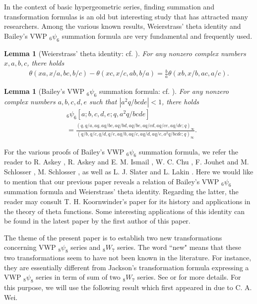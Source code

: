 \documentclass[xits,review,sort&compress]{elsarticle}
\newtheorem{yl}[dl]{Lemma}
\numberwithin{equation}{section}
\begin{document}
In the context of basic hypergeometric series, finding summation and transformation formulas is an old but interesting study that has attracted
many researchers.   Among the various known results, Weierstrass' theta identity and Bailey's VWP ${}_6\psi_6$ summation formula are very fundamental and frequently used.

\begin{yl}[Weierstrass' theta identity: {\rm cf. \cite{koornwinder}}]\label{weierstrass} For any nonzero complex numbers $x,a,b,c$, there holds
\begin{align}
\theta(xa,x/a,bc,b/c)-\theta(xc,x/c,ab,b/a)=\frac{b}{a}
\theta(xb,x/b,ac,a/c).\label{weierid}
\end{align}
\end{yl}


\begin{yl}[Bailey's VWP  ${}_6\psi_6$ summation formula: {\rm cf. \cite[(II.33)]{10}}]\label{baileypsi66} For any nonzero complex numbers $a,b,c,d,e$ such that $ |a^2q/bcde|<1$, there holds
\begin{align}
   &{}_{6} \psi_{6}[a; b, c, d,e; q, a^2q /bcde]\label{Baileysum-0}\\
&=\frac{(q, q / a,a q, a q / b c, a q / b d, a q / b e, a q / c d, a q / c e, a q / d e; q)_{\infty}}{\left( q / b, q / c, q / d, q / e,a q / b, a q / c, a q / d, a q / e, a^{2}q/ b c d e; q\right)_{\infty}}.\nonumber
\end{align}
\end{yl}

 For the various proofs of Bailey's VWP  ${}_6\psi_6$ summation formula, we refer the reader to R. Askey \cite{andrews}, R. Askey and E. M. Ismail \cite{askey},   W. C. Chu \cite{chu}, F. Jouhet and M. Schlosser \cite{2007},  M. Schlosser \cite{schlosser0,schlosser}, as well as  L. J. Slater and L. Lakin \cite{slater0}. Here we would like to mention that  our previous paper \cite{wangjinphd} reveals a relation of Bailey's VWP  ${}_6\psi_6$ summation formula and Weierstrass' theta identity. Regarding the latter, the reader may consult T. H. Koornwinder's paper \cite{koornwinder} for its history and applications in
the theory of theta functions. Some interesting applications of this identity can be found in the latest paper \cite{wangjinphd-0} by the first author of this paper.

 The theme of the present paper is to establish two new transformations concerning VWP ${}_8\psi_8$
series and  ${}_8W_7$ series. The word ``new" means that these two transformations seem to have not been known in the literature. For instance, they are essentially different from Jackson's transformation formula expressing a VWP ${}_8\psi_8$ series in term of sum of two ${}_8W_7$ series. See \cite[Eq. (5.6.2)]{10} or \cite{jackson} for more details.   For this purpose, we will use  the following result which first appeared in \cite{wei} due to C. A. Wei.
\end{document}
